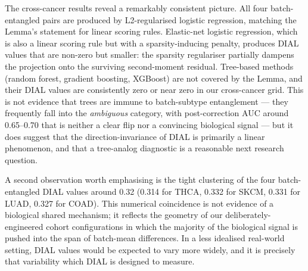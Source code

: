 \documentclass[11pt]{article}
\begin{document}
The cross-cancer results reveal a remarkably consistent picture. All four batch-entangled pairs are produced by L2-regularised logistic regression, matching the Lemma's statement for linear scoring rules. Elastic-net logistic regression, which is also a linear scoring rule but with a sparsity-inducing penalty, produces DIAL values that are non-zero but smaller: the sparsity regulariser partially dampens the projection onto the surviving second-moment residual. Tree-based methods (random forest, gradient boosting, XGBoost) are not covered by the Lemma, and their DIAL values are consistently zero or near zero in our cross-cancer grid. This is not evidence that trees are immune to batch-subtype entanglement --- they frequently fall into the \emph{ambiguous} category, with post-correction AUC around 0.65--0.70 that is neither a clear flip nor a convincing biological signal --- but it does suggest that the direction-invariance of DIAL is primarily a linear phenomenon, and that a tree-analog diagnostic is a reasonable next research question.

A second observation worth emphasising is the tight clustering of the four batch-entangled DIAL values around 0.32 (0.314 for THCA, 0.332 for SKCM, 0.331 for LUAD, 0.327 for COAD). This numerical coincidence is not evidence of a biological shared mechanism; it reflects the geometry of our deliberately-engineered cohort configurations in which the majority of the biological signal is pushed into the span of batch-mean differences. In a less idealised real-world setting, DIAL values would be expected to vary more widely, and it is precisely that variability which DIAL is designed to measure.
\end{document}

